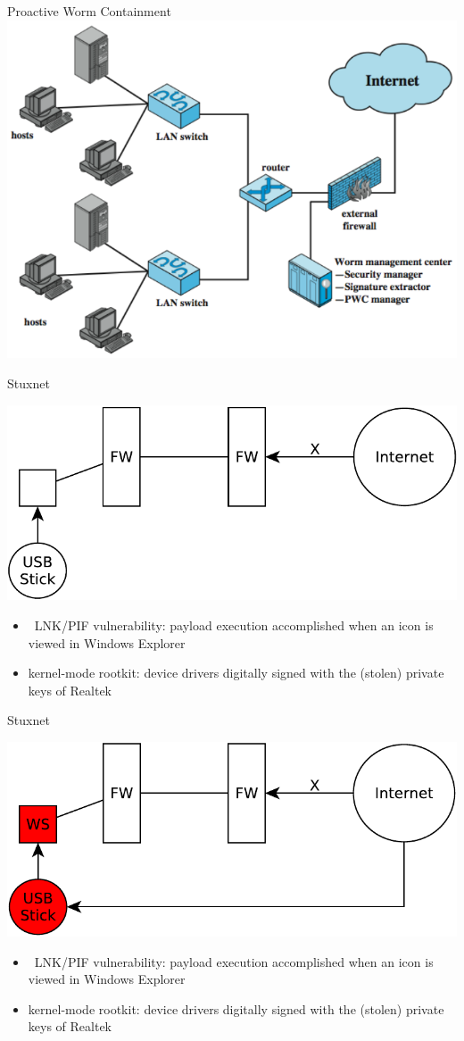 \documentclass{beamer}
\begin{document}
\begin{frame}{Proactive Worm Containment}
\includegraphics[width=0.8\linewidth]{wormContaiment}
\end{frame}

\begin{frame}{Stuxnet}
  \begin{center}
    \includegraphics[width=0.7\linewidth]{stuxnet1}
    \begin{itemize}
    \item   LNK/PIF vulnerability: payload execution accomplished when
      an icon is viewed in Windows Explorer
    \item  kernel-mode rootkit: device drivers digitally signed with
      the (stolen) private keys of Realtek
    \end{itemize}
  \end{center}
\end{frame}

\begin{frame}{Stuxnet}
  \begin{center}
    \includegraphics[width=0.7\linewidth]{stuxnet2}
    \begin{itemize}
    \item   LNK/PIF vulnerability: payload execution accomplished when an icon is viewed in Windows Explorer
    \item  kernel-mode rootkit: device drivers digitally signed with
      the (stolen) private keys of Realtek
    \end{itemize}
  \end{center}
\end{frame}
\end{document}
